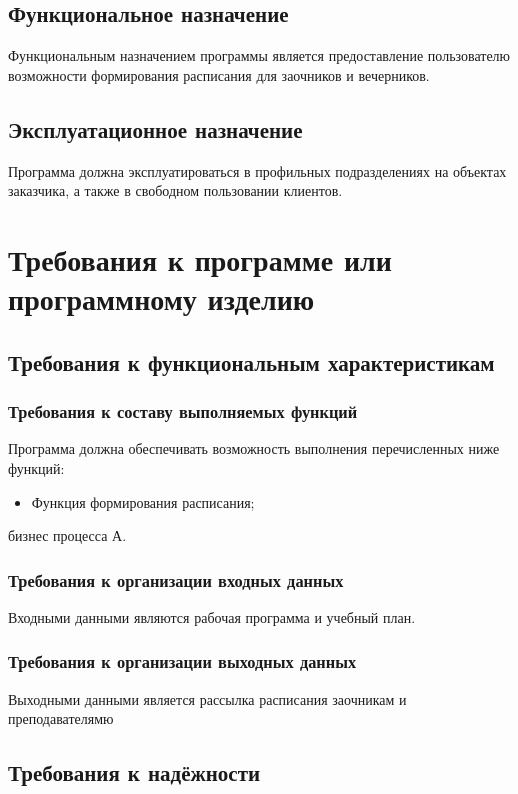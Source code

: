 \documentclass[14pt]{extarticle}
\begin{document}
\subsection{Функциональное назначение}
Функциональным назначением программы является предоставление пользователю возможности формирования расписания для заочников и вечерников.

\subsection{Эксплуатационное назначение}
Программа должна эксплуатироваться в профильных подразделениях на объектах заказчика, а также в свободном пользовании клиентов.

\newpage

\section{Требования к программе или программному изделию}
\subsection{Требования к функциональным характеристикам}
\subsubsection{Требования к составу выполняемых функций}
Программа должна обеспечивать возможность выполнения перечисленных ниже функций:\par
\begin{itemize} 
    \item Функция формирования расписания;
\end{itemize}
 бизнес процесса А.

\subsubsection{Требования к организации входных данных}
Входными данными являются рабочая программа и учебный план.
  
\subsubsection{Требования к организации выходных данных}
Выходными данными является рассылка расписания заочникам и преподавателямю

\subsection{Требования к надёжности}  
\end{document}
